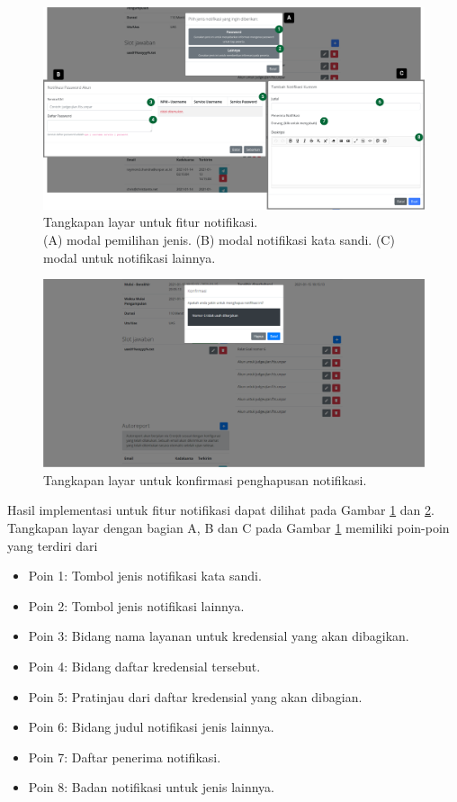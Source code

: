    \begin{figure}
        \centering
        \includegraphics[width=0.7\paperwidth]{Gambar/implemented-interface/admin/ujian-notifikasi.png}
        \caption{Tangkapan layar untuk fitur notifikasi. \\ (A) modal pemilihan jenis. (B) modal notifikasi kata sandi. (C) modal untuk notifikasi lainnya.}
        \label{fig:screenshot-admin-notif}
    \end{figure}
    \begin{figure}
        \centering
        \includegraphics[width=0.7\paperwidth]{Gambar/implemented-interface/admin/ujian-notifikasi-delete.png}
        \caption{Tangkapan layar untuk konfirmasi penghapusan notifikasi.}
        \label{fig:screenshot-admin-notif-delete}
    \end{figure}
    Hasil implementasi untuk fitur notifikasi dapat dilihat pada Gambar \ref{fig:screenshot-admin-notif} dan
    \ref{fig:screenshot-admin-notif-delete}. Tangkapan layar dengan bagian A, B dan C pada Gambar 
    \ref{fig:screenshot-admin-notif} memiliki poin-poin yang terdiri dari
    \begin{itemize}
        \item Poin 1: Tombol jenis notifikasi kata sandi.
        \item Poin 2: Tombol jenis notifikasi lainnya.
        \item Poin 3: Bidang nama layanan untuk kredensial yang akan dibagikan.
        \item Poin 4: Bidang daftar kredensial tersebut.
        \item Poin 5: Pratinjau dari daftar kredensial yang akan dibagian.
        \item Poin 6: Bidang judul notifikasi jenis lainnya.
        \item Poin 7: Daftar penerima notifikasi.
        \item Poin 8: Badan notifikasi untuk jenis lainnya.
    \end{itemize}
